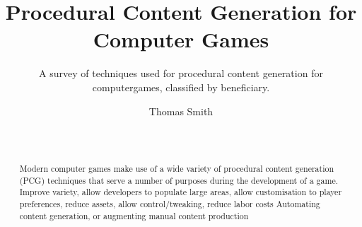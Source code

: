 \documentclass{./acm_proc_article-sp}
\begin{document}
\title{Procedural Content Generation for Computer Games}
\subtitle{A survey of techniques used for procedural content generation for computergames, classified by beneficiary.}

\author{
\alignauthor
Thomas Smith\\
       \\
       \\
}

\maketitle
\begin{abstract}
Modern computer games make use of a wide variety of procedural content generation (PCG) techniques that serve a number of purposes during the development of a game. 
Improve variety, allow developers to populate large areas, allow customisation to player preferences, reduce assets, allow control/tweaking, reduce labor costs
Automating content generation, or augmenting manual content production


\end{abstract}
\end{document}

